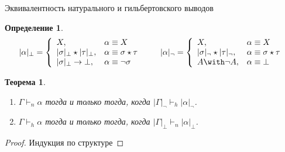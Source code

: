 \documentclass[aspectratio=169]{beamer}
\newtheorem{thm}{Теорема}[section]
\newtheorem{dfn}{Определение}[section]
\begin{document}
\begin{frame}{Эквивалентность натурального и гильбертовского выводов}
\begin{dfn}$$|\alpha|_\bot = \left\{\begin{array}{ll}X,&\alpha\equiv X\\|\sigma|_\bot\star|\tau|_\bot,& \alpha\equiv\sigma\star\tau\\
                                                     |\sigma|_\bot\rightarrow\bot,& \alpha\equiv\neg\sigma\end{array}\right.\quad\quad
             |\alpha|_\neg = \left\{\begin{array}{ll}X,&\alpha\equiv X\\|\sigma|_\neg\star|\tau|_\neg,& \alpha\equiv\sigma\star\tau\\A\with\neg A,& \alpha\equiv\bot\end{array}\right.
$$\end{dfn}
\begin{thm}\begin{enumerate}\item $\Gamma\vdash_n\alpha$ тогда и только тогда, когда $|\Gamma|_\neg\vdash_h|\alpha|_\neg$.
\item $\Gamma\vdash_h\alpha$ тогда и только тогда, когда $|\Gamma|_\bot\vdash_n|\alpha|_\bot$.
\end{enumerate}
\end{thm}
\begin{proof}Индукция по структуре\end{proof}
\end{frame}
\end{document}
